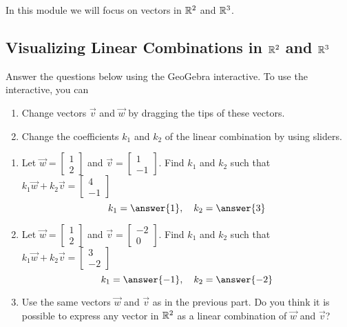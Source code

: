 \documentclass{ximera}
\begin{document}
In this module we will focus on vectors in $\mathbb{R}^2$ and $\mathbb{R}^3$.
\subsection*{Visualizing Linear Combinations in $\mathbb{R}^2$ and $\mathbb{R}^3$}

\begin{exploration}\label{exp:linCombR2}
Answer the questions below using the GeoGebra interactive.  To use the interactive, you can
\begin{enumerate}
    \item Change vectors $\vec{v}$ and $\vec{w}$ by dragging the tips of these vectors.
    \item Change the coefficients $k_1$ and $k_2$ of the linear combination by using sliders.
\end{enumerate}
\begin{center} 
\end{center}

\begin{enumerate}
\item Let $\vec{w}=\begin{bmatrix}1\\2\end{bmatrix}$ and $\vec{v}=\begin{bmatrix}1\\-1\end{bmatrix}$.  Find $k_1$ and $k_2$ such that $k_1\vec{w}+k_2\vec{v}=\begin{bmatrix}4\\-1\end{bmatrix}$
$$k_1=\answer{1},\quad k_2=\answer{3}$$

\item Let $\vec{w}=\begin{bmatrix}1\\2\end{bmatrix}$ and $\vec{v}=\begin{bmatrix}-2\\0\end{bmatrix}$.  Find $k_1$ and $k_2$ such that $k_1\vec{w}+k_2\vec{v}=\begin{bmatrix}3\\-2\end{bmatrix}$
$$k_1=\answer{-1},\quad k_2=\answer{-2}$$

\item
Use the same vectors $\vec{w}$ and $\vec{v}$ as in the previous part.  Do you think it is possible to express any vector in $\mathbb{R}^2$ as a linear combination of $\vec{w}$ and $\vec{v}$?  


\end{enumerate}
\end{exploration}
\end{document}
